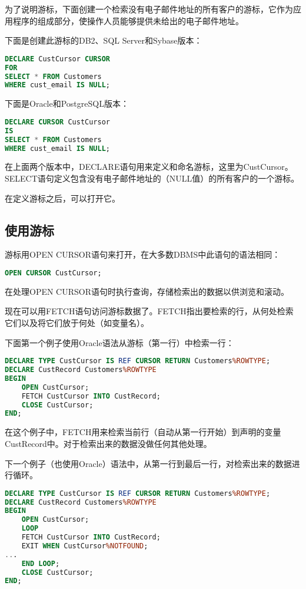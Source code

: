 为了说明游标，下面创建一个检索没有电子邮件地址的所有客户的游标，它作为应用程序的组成部分，使操作人员能够提供未给出的电子邮件地址。

下面是创建此游标的DB2、SQL Server和Sybase版本：

\begin{lstlisting}[language=SQL]
DECLARE CustCursor CURSOR
FOR
SELECT * FROM Customers
WHERE cust_email IS NULL;
\end{lstlisting}


下面是Oracle和PostgreSQL版本：

\begin{lstlisting}[language=SQL]
DECLARE CURSOR CustCursor
IS
SELECT * FROM Customers
WHERE cust_email IS NULL;
\end{lstlisting}

在上面两个版本中，DECLARE语句用来定义和命名游标，这里为CustCursor。SELECT语句定义包含没有电子邮件地址的（NULL值）的所有客户的一个游标。

在定义游标之后，可以打开它。


\subsection{使用游标}

游标用OPEN CURSOR语句来打开，在大多数DBMS中此语句的语法相同：


\begin{lstlisting}[language=SQL]
OPEN CURSOR CustCursor;
\end{lstlisting}

在处理OPEN CURSOR语句时执行查询，存储检索出的数据以供浏览和滚动。


现在可以用FETCH语句访问游标数据了。FETCH指出要检索的行，从何处检索它们以及将它们放于何处（如变量名）。


下面第一个例子使用Oracle语法从游标（第一行）中检索一行：

\begin{lstlisting}[language=SQL]
DECLARE TYPE CustCursor IS REF CURSOR RETURN Customers%ROWTYPE;
DECLARE CustRecord Customers%ROWTYPE
BEGIN
	OPEN CustCursor;
	FETCH CustCursor INTO CustRecord;
	CLOSE CustCursor;
END;
\end{lstlisting}

在这个例子中，FETCH用来检索当前行（自动从第一行开始）到声明的变量CustRecord中。对于检索出来的数据没做任何其他处理。


下一个例子（也使用Oracle）语法中，从第一行到最后一行，对检索出来的数据进行循环。

\begin{lstlisting}[language=SQL]
DECLARE TYPE CustCursor IS REF CURSOR RETURN Customers%ROWTYPE;
DECLARE CustRecord Customers%ROWTYPE
BEGIN
	OPEN CustCursor;
	LOOP
	FETCH CustCursor INTO CustRecord;
	EXIT WHEN CustCursor%NOTFOUND;
...
	END LOOP;
	CLOSE CustCursor;
END;
\end{lstlisting}

